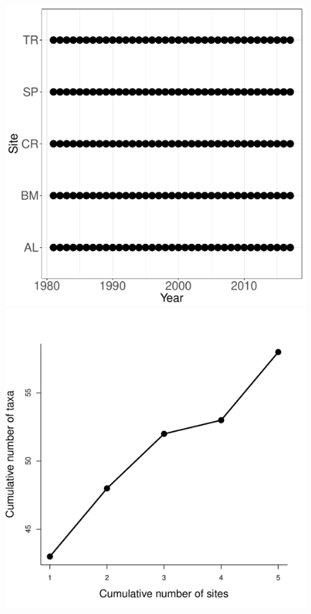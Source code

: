 \documentclass[11pt, oneside]{article}
\begin{document}
\begin{figure}[h!]
\includegraphics[scale = 0.4]{ntl-fish-stanleyLottig_spatiotemporal_sampling_effort.pdf}
\includegraphics[scale = 0.4]{ntl-fish-stanleyLottig_species_accumulation_space.pdf}

\end{figure}
\end{document}

